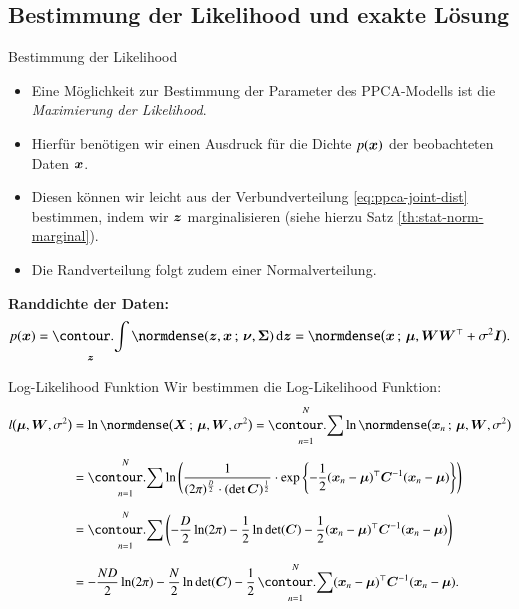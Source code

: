 \subsection{Bestimmung der Likelihood und exakte Lösung}

\begin{frame}{Bestimmung der Likelihood}{}
	\begin{itemize}
		\item Eine Möglichkeit zur Bestimmung der Parameter des PPCA-Modells ist die \textit{Maximierung der Likelihood}.
		\item Hierfür benötigen wir einen Ausdruck für die Dichte $p(\bm{x})$ der beobachteten Daten $\bm{x}$.
		\item Diesen können wir leicht aus der Verbundverteilung \eqref{eq:ppca-joint-dist} bestimmen, indem wir $\bm{z}$ marginalisieren
			(siehe hierzu Satz \ref{th:stat-norm-marginal}).
		\item Die Randverteilung folgt zudem einer Normalverteilung.
	\end{itemize}
	
	\begin{boxGray}
		\textbf{Randdichte der Daten:}
		\begin{equation*}
			p(\bx)
				= \int_{\bz} \normdense(\bz, \bx \param \bnu, \bSigma)\,\diff \bz
				= \normdense\bigl( \bx \param \bmu, \bW \bW^\top + \sigma^2 \bI \bigr).
		\end{equation*}
	\end{boxGray}
\end{frame}


\begin{frame}{Log-Likelihood Funktion}{}
	Wir bestimmen die Log-Likelihood Funktion:
	\begin{equation}
		\begin{aligned} \label{eq:ppca-log-likelihood}
			l\bigl( \bmu, \bW, \sigma^2 \bigr)
				&= \ln \normdense\bigl( \bX \param \bmu, \bW, \sigma^2 \bigr)
					= \sum_{n=1}^N \ln \normdense\bigl( \bx_n \param \bmu, \bW, \sigma^2 \bigr)
		\\[2mm]
				&= \sum_{n=1}^N \ln\left( \frac{1}{(2 \pi)^\frac{D}{2} \cdot (\det \bC)^{\frac{1}{2}}} \cdot \exp\left\{
					-\frac{1}{2} (\bx_n - \bmu)^\top \bC^{-1} (\bx_n - \bmu) \right\}
				\right)
		\\[2mm]
				&= \sum_{n=1}^N \left(
					-\frac{D}{2} \ln(2 \pi) - \frac{1}{2} \ln \det(\bC) - \frac{1}{2} (\bx_n - \bmu)^\top \bC^{-1} (\bx_n - \bmu)
				\right)
		\\[2mm]
				&= -\frac{ND}{2} \ln(2 \pi) - \frac{N}{2} \ln \det(\bC) - \frac{1}{2} \sum_{n=1}^N (\bx_n - \bmu)^\top \bC^{-1} (\bx_n - \bmu).
		\end{aligned}
	\end{equation}
\end{frame}


